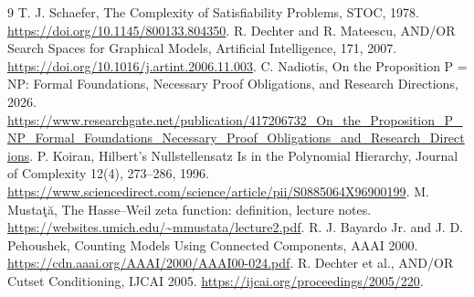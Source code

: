 \documentclass[11pt,a4paper]{article}
\begin{document}
\begin{thebibliography}{9}
T. J. Schaefer, The Complexity of Satisfiability Problems,
STOC, 1978. \url{https://doi.org/10.1145/800133.804350}.
R. Dechter and R. Mateescu, AND/OR Search Spaces for Graphical
Models, Artificial Intelligence, 171, 2007.
\url{https://doi.org/10.1016/j.artint.2006.11.003}.
C. Nadiotis, On the Proposition P = NP: Formal Foundations,
Necessary Proof Obligations, and Research Directions, 2026.
\url{https://www.researchgate.net/publication/417206732_On_the_Proposition_P_NP_Formal_Foundations_Necessary_Proof_Obligations_and_Research_Directions}.
P. Koiran, Hilbert's Nullstellensatz Is in the Polynomial Hierarchy,
Journal of Complexity 12(4), 273--286, 1996.
\url{https://www.sciencedirect.com/science/article/pii/S0885064X96900199}.
M. Musta\c{t}\u{a}, The Hasse--Weil zeta function: definition,
lecture notes. \url{https://websites.umich.edu/~mmustata/lecture2.pdf}.
R. J. Bayardo Jr. and J. D. Pehoushek, Counting Models Using
Connected Components, AAAI 2000.
\url{https://cdn.aaai.org/AAAI/2000/AAAI00-024.pdf}.
R. Dechter et al., AND/OR Cutset Conditioning,
IJCAI 2005. \url{https://ijcai.org/proceedings/2005/220}.
\end{thebibliography}
\end{document}
